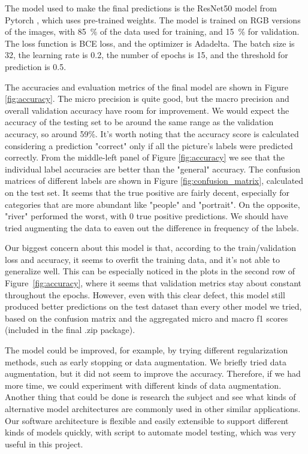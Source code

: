 \documentclass[a4paper, 12pt]{article}
\begin{document}
The model used to make the final predictions is the ResNet50 model from Pytorch \cite{pytorch}, which uses pre-trained weights. The model is trained on RGB versions of the images, with 85~\% of the data used for training, and 15~\% for validation. The loss function is BCE loss, and the optimizer is Adadelta. The batch size is 32, the learning rate is 0.2, the number of epochs is 15, and the threshold for prediction is 0.5.

The accuracies and evaluation metrics of the final model are shown in Figure \ref{fig:accuracy}. The micro precision is quite good, but the macro precision and overall validation accuracy have room for improvement. We would expect the accuracy of the testing set to be around the same range as the validation accuracy, so around 59\%. It's worth noting that the accuracy score is calculated considering a prediction "correct" only if all the picture's labels were predicted correctly. From the middle-left panel of Figure \ref{fig:accuracy} we see that the individual label accuracies are better than the "general" accuracy. The confusion matrices of different labels are shown in Figure \ref{fig:confusion_matrix}, calculated on the test set. It seems that the true positive are fairly decent, especially for categories that are more abundant like "people" and "portrait". On the opposite, "river" performed the worst, with 0 true positive predictions. We should have tried augmenting the data to eaven out the difference in frequency of the labels.

Our biggest concern about this model is that, according to the train/validation loss and accuracy, it seems to overfit the training data, and it's not able to generalize well. This can be especially noticed in the plots in the second row of Figure~\ref{fig:accuracy}, where it seems that validation metrics stay about constant throughout the epochs. However, even with this clear defect, this model still produced better predictions on the test dataset than every other model we tried, based on the confusion matrix and the aggregated micro and macro f1 scores (included in the final .zip package).

The model could be improved, for example, by trying different regularization methods, such as early stopping or data augmentation. We briefly tried data augmentation, but it did not seem to improve the accuracy. Therefore, if we had more time, we could experiment with different kinds of data augmentation. Another thing that could be done is research the subject and see what kinds of alternative model architectures are commonly used in other similar applications. Our software architecture is flexible and easily extensible to support different kinds of models quickly, with script to automate model testing, which was very useful in this project.
\end{document}
